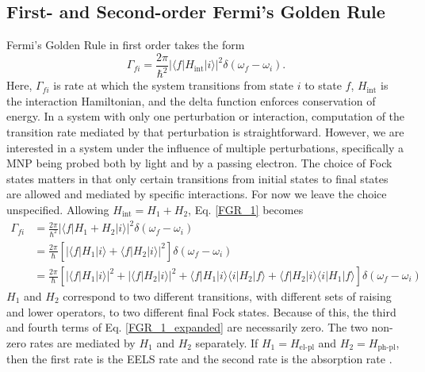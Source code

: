 \documentclass [11pt, proquest] {uwthesis}[2016/11/22]
\begin{document}
\subsection{First- and Second-order Fermi's Golden Rule}

Fermi's Golden Rule in first order takes the form
\begin{equation}
\Gamma_{fi} = \frac{2\pi}{\hbar^2}|\langle f |H_{\textrm{int}}| i \rangle |^2 \delta(\omega_f - \omega_i).
\label{FGR_1}
\end{equation}
Here, $\Gamma_{fi}$ is rate at which the system transitions from state $i$ to state $f$, $H_{\textrm{int}}$ is the interaction Hamiltonian, and the delta function enforces conservation of energy. In a system with only one perturbation or interaction, computation of the transition rate mediated by that perturbation is straightforward. However, we are interested in a system under the influence of multiple perturbations, specifically a MNP being probed both by light and by a passing electron. The choice of Fock states matters in that only certain transitions from initial states to final states are allowed and mediated by specific interactions. For now we leave the choice unspecified. Allowing $H_{\textrm{int}} = H_1 + H_2$, Eq. \ref{FGR_1} becomes
\begin{equation}
\begin{aligned}
\Gamma_{fi} &= \frac{2\pi}{\hbar^2}|\langle f |H_1 + H_2| i \rangle |^2 \delta(\omega_f - \omega_i)\\
&= \frac{2\pi}{\hbar}\left[|\langle f |H_1| i \rangle + \langle f |H_2| i \rangle |^2\right] \delta(\omega_f - \omega_i)\\
& = \frac{2\pi}{\hbar}\left[|\langle f|H_1|i \rangle|^2 + |\langle f|H_2|i \rangle|^2 + \langle f|H_1|i \rangle \langle i|H_2|f \rangle + \langle f|H_2|i \rangle \langle i|H_1|f \rangle\right]\delta(\omega_f - \omega_i)
\label{FGR_1_expanded}
\end{aligned}
\end{equation}
$H_1$ and $H_2$ correspond to two different transitions, with different sets of raising and lower operators, to two different final Fock states. Because of this, the third and fourth terms of Eq. \ref{FGR_1_expanded} are necessarily zero. The two non-zero rates are mediated by $H_1$ and $H_2$ separately. If $H_1 = H_\textrm{el-pl}$ and $H_2 = H_{\textrm{ph-pl}}$, then the first rate is the EELS rate and the second rate is the absorption rate \cite{EEGS}.
\end{document}
